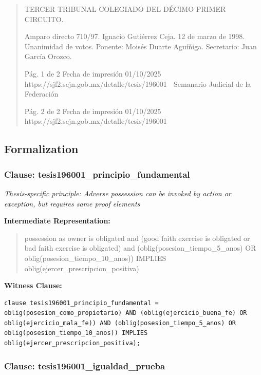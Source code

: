 \documentclass[11pt,a4paper]{article}
\begin{document}
\begin{quote}
TERCER TRIBUNAL COLEGIADO DEL DÉCIMO PRIMER CIRCUITO.


Amparo directo 710/97. Ignacio Gutiérrez Ceja. 12 de marzo de 1998. Unanimidad de votos.
Ponente: Moisés Duarte Aguíñiga. Secretario: Juan García Orozco.




                                             Pág. 1 de 2             Fecha de impresión 01/10/2025
  https://sjf2.scjn.gob.mx/detalle/tesis/196001
                                                Semanario Judicial de la Federación




                                           Pág. 2 de 2       Fecha de impresión 01/10/2025
https://sjf2.scjn.gob.mx/detalle/tesis/196001

\end{quote}

\subsection{Formalization}

\subsubsection{Clause: tesis196001\_principio\_fundamental}

\textit{Thesis-specific principle: Adverse possession can be invoked by action or exception, but requires same proof elements}

\textbf{Intermediate Representation:}

\begin{quote}
possession as owner is obligated and (good faith exercise is obligated or bad faith exercise is obligated) and (oblig(posesion\_tiempo\_5\_anos) OR oblig(posesion\_tiempo\_10\_anos)) IMPLIES oblig(ejercer\_prescripcion\_positiva)
\end{quote}

\textbf{Witness Clause:}

\begin{lstlisting}[style=witnessstyle, language=Witness]
clause tesis196001_principio_fundamental = oblig(posesion_como_propietario) AND (oblig(ejercicio_buena_fe) OR oblig(ejercicio_mala_fe)) AND (oblig(posesion_tiempo_5_anos) OR oblig(posesion_tiempo_10_anos)) IMPLIES oblig(ejercer_prescripcion_positiva);
\end{lstlisting}

\subsubsection{Clause: tesis196001\_igualdad\_prueba}
\end{document}
